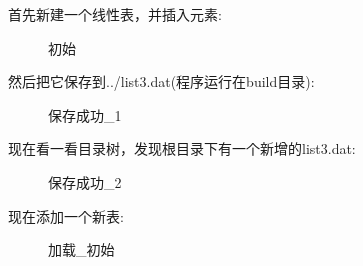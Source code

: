 \documentclass[supercite]{Experimental_Report}
\theoremstyle{definition}
\begin{document}
\noindent
首先新建一个线性表，并插入元素:
\begin{figure}[htbp]
	\centering
	\centering
	\caption{初始}
	\label{fig3-2}
\end{figure}

\noindent
然后把它保存到../list3.dat(程序运行在build目录):
\begin{figure}[htbp]
	\centering
	\centering
	\caption{保存成功\_1}
	\label{fig3-3}
\end{figure}

\clearpage
\noindent
现在看一看目录树，发现根目录下有一个新增的list3.dat:
\begin{figure}[htbp]
	\centering
	\centering
	\caption{保存成功\_2}
	\label{fig3-4}
\end{figure}

\noindent
现在添加一个新表:
\begin{figure}[htbp]
	\centering
	\centering
	\caption{加载\_初始}
	\label{fig3-5}
\end{figure}
\end{document}
